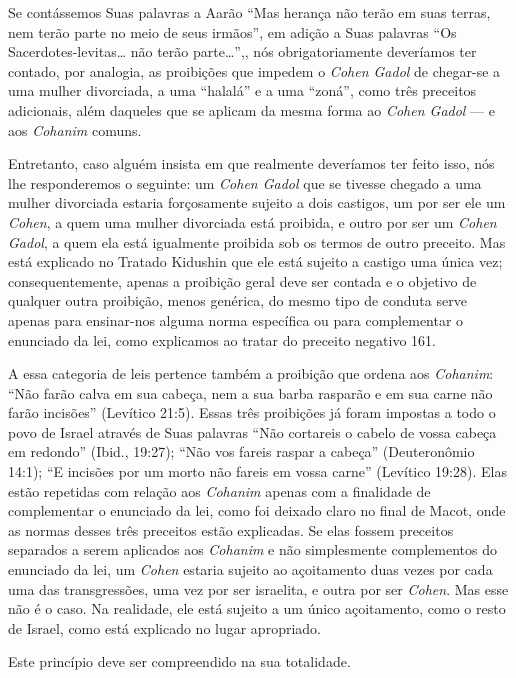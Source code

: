 Se contássemos Suas palavras a Aarão ``Mas herança não terão em suas
terras, nem terão parte no meio de seus irmãos'', em adição a Suas
palavras ``Os Sacerdotes-levitas\ldots{} não terão parte\ldots{}'',, nós
obrigatoriamente deveríamos ter contado, por analogia, as proibições
que impedem o \textit{Cohen Gadol} de chegar-se a uma mulher divorciada, a
uma ``halalá'' e a uma ``zoná'', como três preceitos adicionais, além
daqueles que se aplicam da mesma forma ao \textit{Cohen Gadol} --- e aos
\textit{Cohanim} comuns.

Entretanto, caso alguém insista em que realmente deveríamos ter feito
isso, nós lhe responderemos o seguinte: um \textit{Cohen
Gadol} que se tivesse chegado a uma mulher divorciada estaria
forçosamente sujeito a dois castigos, um por ser ele um \textit{Cohen}, a
quem uma mulher divorciada está proibida, e outro por ser um \textit{Cohen
Gadol}, a quem ela está igualmente proibida sob os termos de outro
preceito. Mas está explicado no Tratado Kidushin que ele está sujeito a
castigo uma única vez; consequentemente, apenas a proibição geral deve
ser contada e o objetivo de qualquer outra proibição, menos genérica, do
mesmo tipo de conduta serve apenas para ensinar-nos alguma norma
específica ou para complementar o enunciado da lei, como explicamos ao
tratar do preceito negativo 161.

A essa categoria de leis pertence também a proibição que ordena aos
\textit{Cohanim}: ``Não farão calva em sua cabeça, nem a sua barba rasparão e
em sua carne não farão incisões'' (Levítico 21:5). Essas três proibições
já foram impostas a todo o povo de Israel através de Suas palavras
``Não cortareis o cabelo de vossa cabeça em redondo'' (Ibid., 19:27);
``Não vos fareis raspar a cabeça'' (Deuteronômio 14:1); ``E incisões por
um morto não fareis em vossa carne'' (Levítico 19:28). Elas estão
repetidas com relação aos \textit{Cohanim} apenas com a finalidade de
complementar o enunciado da lei, como foi deixado claro no final de
Macot, onde as normas desses três preceitos estão explicadas. Se elas
fossem preceitos separados a serem aplicados aos \textit{Cohanim} e não
simplesmente complementos do enunciado da lei, um \textit{Cohen} estaria
sujeito ao açoitamento duas vezes por cada uma das transgressões, uma
vez por ser israelita, e outra por ser \textit{Cohen}. Mas esse não é o caso.
Na realidade, ele está sujeito a um único açoitamento, como o resto de
Israel, como está explicado no lugar apropriado.

Este princípio deve ser compreendido na sua totalidade.

